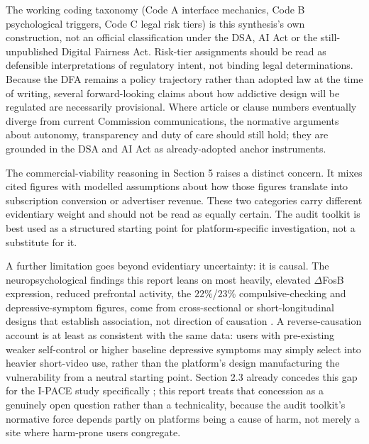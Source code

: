\documentclass[11pt]{article}
\begin{document}
The working coding taxonomy (Code A interface mechanics, Code B psychological triggers, Code C legal risk tiers) is this synthesis's own construction, not an official classification under the DSA, AI Act or the still-unpublished Digital Fairness Act. Risk-tier assignments should be read as defensible interpretations of regulatory intent, not binding legal determinations. Because the DFA remains a policy trajectory rather than adopted law at the time of writing, several forward-looking claims about how addictive design will be regulated are necessarily provisional. Where article or clause numbers eventually diverge from current Commission communications, the normative arguments about autonomy, transparency and duty of care should still hold; they are grounded in the DSA and AI Act as already-adopted anchor instruments.

The commercial-viability reasoning in Section 5 raises a distinct concern. It mixes cited figures with modelled assumptions about how those figures translate into subscription conversion or advertiser revenue. These two categories carry different evidentiary weight and should not be read as equally certain. The audit toolkit is best used as a structured starting point for platform-specific investigation, not a substitute for it.

A further limitation goes beyond evidentiary uncertainty: it is causal. The neuropsychological findings this report leans on most heavily, elevated $\Delta$FosB expression, reduced prefrontal activity, the $22\%$/$23\%$ compulsive-checking and depressive-symptom figures, come from cross-sectional or short-longitudinal designs that establish association, not direction of causation \parencites[4]{8958037}. A reverse-causation account is at least as consistent with the same data: users with pre-existing weaker self-control or higher baseline depressive symptoms may simply select into heavier short-video use, rather than the platform's design manufacturing the vulnerability from a neutral starting point. Section 2.3 already concedes this gap for the I-PACE study specifically \parencites[4]{8958037}; this report treats that concession as a genuinely open question rather than a technicality, because the audit toolkit's normative force depends partly on platforms being a cause of harm, not merely a site where harm-prone users congregate.
\end{document}
